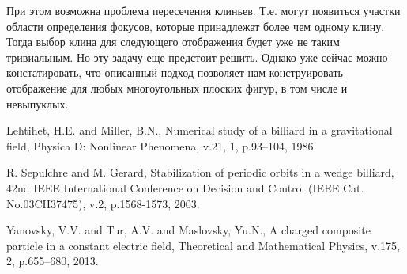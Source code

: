 \documentclass[a4paper]{article}
\begin{document}
При этом возможна проблема пересечения клиньев. Т.е. могут появиться участки области определения фокусов, которые принадлежат более чем одному клину. Тогда выбор клина для следующего отображения будет уже не таким тривиальным. Но эту задачу еще предстоит решить. Однако уже сейчас можно констатировать, что описанный подход позволяет нам конструировать отображение для любых многоугольных плоских фигур, в том числе и невыпуклых.

\begin{thebibliography}{31}
Lehtihet, H.E. and Miller, B.N., Numerical study of a billiard in a gravitational field, Physica D: Nonlinear Phenomena, v.21, 1, p.93--104, 1986.

R. Sepulchre and M. Gerard, Stabilization of periodic orbits in a wedge billiard, 42nd IEEE International Conference on Decision and Control (IEEE Cat. No.03CH37475), v.2, p.1568-1573, 2003.

Yanovsky, V.V. and Tur, A.V. and Maslovsky, Yu.N., A charged composite particle in a constant electric field, Theoretical and Mathematical Physics, v.175, 2, p.655--680, 2013.









\end{thebibliography}
\end{document}

